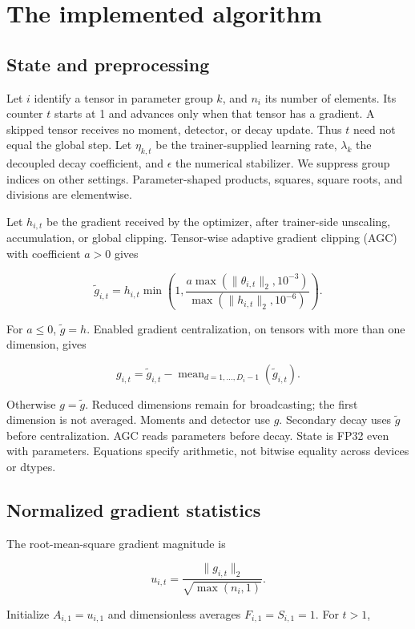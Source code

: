 \documentclass[11pt,a4paper]{article}
\theoremstyle{definition}
\theoremstyle{remark}
\begin{document}
\section{The implemented algorithm}\label{sec:implemented}

\subsection{State and preprocessing}

Let $i$ identify a tensor in parameter group $k$, and $n_i$ its number of elements. Its counter $t$ starts at 1 and advances only when that tensor has a gradient. A skipped tensor receives no moment, detector, or decay update. Thus $t$ need not equal the global step. Let $\eta_{k,t}$ be the trainer-supplied learning rate, $\lambda_k$ the decoupled decay coefficient, and $\epsilon$ the numerical stabilizer. We suppress group indices on other settings. Parameter-shaped products, squares, square roots, and divisions are elementwise.

Let $h_{i,t}$ be the gradient received by the optimizer, after trainer-side unscaling, accumulation, or global clipping. Tensor-wise adaptive gradient clipping (AGC) with coefficient $a>0$ gives

\[
\widetilde g_{i,t}=h_{i,t}\min\left(1,\frac{a\max(\|\theta_{i,t}\|_2,10^{-3})}{\max(\|h_{i,t}\|_2,10^{-6})}\right).
\]

For $a\leq0$, $\widetilde g=h$. Enabled gradient centralization, on tensors with more than one dimension, gives

\[
g_{i,t}=\widetilde g_{i,t}-\operatorname{mean}_{d=1,\ldots,D_i-1}(\widetilde g_{i,t}).
\]

Otherwise $g=\widetilde g$. Reduced dimensions remain for broadcasting; the first dimension is not averaged. Moments and detector use $g$. Secondary decay uses $\widetilde g$ before centralization. AGC reads parameters before decay. State is FP32 even with  parameters. Equations specify arithmetic, not bitwise equality across devices or dtypes.

\subsection{Normalized gradient statistics}

The root-mean-square gradient magnitude is

\[
u_{i,t}=\frac{\|g_{i,t}\|_2}{\sqrt{\max(n_i,1)}}.
\]

Initialize $A_{i,1}=u_{i,1}$ and dimensionless averages $F_{i,1}=S_{i,1}=1$. For $t>1$,
\end{document}
